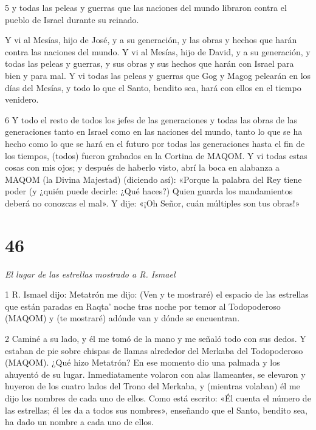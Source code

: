 \par 5 y todas las peleas y guerras que las naciones del mundo libraron contra el pueblo de Israel durante su reinado.

\par Y vi al Mesías, hijo de José, y a su generación, y las obras y hechos que harán contra las naciones del mundo. Y vi al Mesías, hijo de David, y a su generación, y todas las peleas y guerras, y sus obras y sus hechos que harán con Israel para bien y para mal. Y vi todas las peleas y guerras que Gog y Magog pelearán en los días del Mesías, y todo lo que el Santo, bendito sea, hará con ellos en el tiempo venidero.

\par 6 Y todo el resto de todos los jefes de las generaciones y todas las obras de las generaciones tanto en Israel como en las naciones del mundo, tanto lo que se ha hecho como lo que se hará en el futuro por todas las generaciones hasta el fin de los tiempos, (todos) fueron grabados en la Cortina de MAQOM. Y vi todas estas cosas con mis ojos; y después de haberlo visto, abrí la boca en alabanza a MAQOM (la Divina Majestad) (diciendo así): «Porque la palabra del Rey tiene poder (y ¿quién puede decirle: ¿Qué haces?) Quien guarda los mandamientos deberá no conozcas el mal». Y dije: «¡Oh Señor, cuán múltiples son tus obras!»



\chapter{46}

\par \textit{El lugar de las estrellas mostrado a R. Ismael}

\par 1 R. Ismael dijo: Metatrón me dijo: (Ven y te mostraré) el espacio de las estrellas que están paradas en Raqta' noche tras noche por temor al Todopoderoso (MAQOM) y (te mostraré) adónde van y dónde se encuentran.

\par 2 Caminé a su lado, y él me tomó de la mano y me señaló todo con sus dedos. Y estaban de pie sobre chispas de llamas alrededor del Merkaba del Todopoderoso (MAQOM). ¿Qué hizo Metatrón? En ese momento dio una palmada y los ahuyentó de su lugar. Inmediatamente volaron con alas llameantes, se elevaron y huyeron de los cuatro lados del Trono del Merkaba, y (mientras volaban) él me dijo los nombres de cada uno de ellos. Como está escrito: «Él cuenta el número de las estrellas; él les da a todos sus nombres», enseñando que el Santo, bendito sea, ha dado un nombre a cada uno de ellos.

